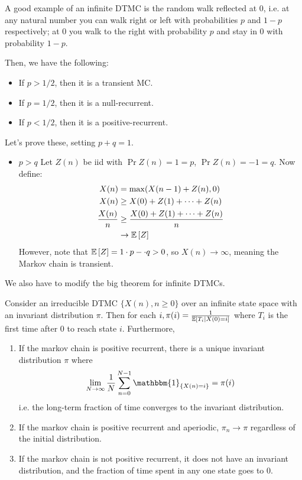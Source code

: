 A good example of an infinite DTMC is the random walk reflected at 0, i.e. at any natural number you can walk right or left with probabilities
$p$ and $1-p$ respectively; at 0 you walk
to the right with probability $p$ and stay in 0 with probability $1 - p$.

Then, we have the following:
\begin{itemize}
    \item If $p > 1/2$, then it is a transient MC.
    \item If $p = 1/2$, then it is a null-recurrent.
    \item If $p < 1/2$, then it is a positive-recurrent.
\end{itemize}
Let's prove these, setting $p + q = 1$.
\begin{proof*}
    \begin{itemize}
        \item $p > q$
        Let $Z(n)$ be iid with $\Pr{Z(n) = 1} = p$, $\Pr{Z(n) = -1} = q$. Now define:
        \begin{align*} 
            X(n) &= \max(X(n - 1) + Z(n), 0) \\
            X(n) &\geq X(0) + Z(1) + \dots + Z(n) \\
            \frac{X(n)}{n} &\geq \frac{X(0) + Z(1) + \dots + Z(n)}{n} \\
            &\to \mathbb{E}\left[ Z \right]
        \end{align*}
        However, note that $\mathbb{E}\left[ Z \right] = 1 \cdot p - \cdot q > 0 $, so $X(n) \to \infty$, meaning
        the Markov chain is transient.
    \end{itemize}

\end{proof*}


We also have to modify the big theorem for infinite DTMCs.

\begin{theorem}
    Consider an irreducible DTMC $\{X(n), n \geq 0\}$ over an infinite state space with an invariant
    distribution $\pi$. Then for each $i, \pi(i) = \frac{1}{\mathbb{E}\left[ T_i \mid X(0) = i \right]}$ where $T_i$ is
    the first time after 0 to reach state $i$. Furthermore,

    \begin{enumerate}
        \item If the markov chain is positive recurrent, there is a unique invariant distribution $\pi$ where
        \begin{align*}
            \lim_{N \to \infty} \frac{1}{N} \sum_{n = 0}^{N - 1} \mathbbm{1}_{\{X(n) = i\}} = \pi(i)
        \end{align*}
        i.e. the long-term fraction of time converges to the invariant distribution.
        \item If the markov chain is positive recurrent and aperiodic, $\pi_n \to \pi$ regardless of the initial distribution.
        \item If the markov chain is not positive recurrent, it does not have an invariant distribution, and the
        fraction of time spent in any one state goes to 0.
    \end{enumerate}
\end{theorem}

